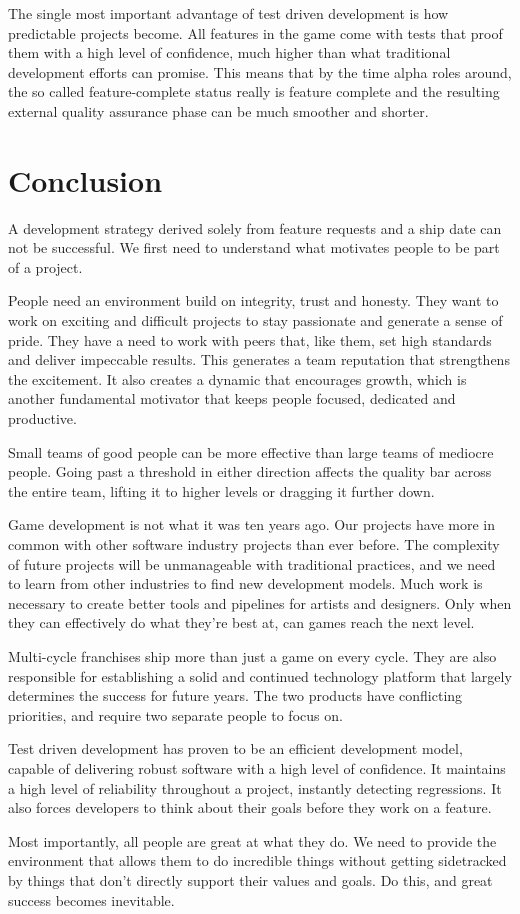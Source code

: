 \documentclass[twocolumn]{paper}
\begin{document}
The single most important advantage of test driven development is
how predictable projects become. All features in the game come with
tests that proof them with a high level of confidence, much higher
than what traditional development efforts can promise. This means
that by the time alpha roles around, the so called feature-complete
status really is feature complete and the resulting external quality
assurance phase can be much smoother and shorter.

\section{Conclusion}

A development strategy derived solely from feature requests and a
ship date can not be successful. We first need to understand what
motivates people to be part of a project.

People need an environment build on integrity, trust and honesty.
They want to work on exciting and difficult projects to stay
passionate and generate a sense of pride. They have a need to work
with peers that, like them, set high standards and deliver
impeccable results. This generates a team reputation that
strengthens the excitement. It also creates a dynamic that
encourages growth, which is another fundamental motivator that keeps
people focused, dedicated and productive.

Small teams of good people can be more effective than large teams of
mediocre people. Going past a threshold in either direction affects
the quality bar across the entire team, lifting it to higher levels
or dragging it further down.

Game development is not what it was ten years ago. Our projects have
more in common with other software industry projects than ever
before. The complexity of future projects will be unmanageable with
traditional practices, and we need to learn from other industries to
find new development models. Much work is necessary to create better
tools and pipelines for artists and designers. Only when they can
effectively do what they're best at, can games reach the next level.

Multi-cycle franchises ship more than just a game on every cycle.
They are also responsible for establishing a solid and continued
technology platform that largely determines the success for future
years. The two products have conflicting priorities, and require two
separate people to focus on.

Test driven development has proven to be an efficient development
model, capable of delivering robust software with a high level of
confidence. It maintains a high level of reliability throughout a
project, instantly detecting regressions. It also forces developers
to think about their goals before they work on a feature.

Most importantly, all people are great at what they do. We need to
provide the environment that allows them to do incredible things
without getting sidetracked by things that don't directly support
their values and goals. Do this, and great success becomes
inevitable.
\end{document}
